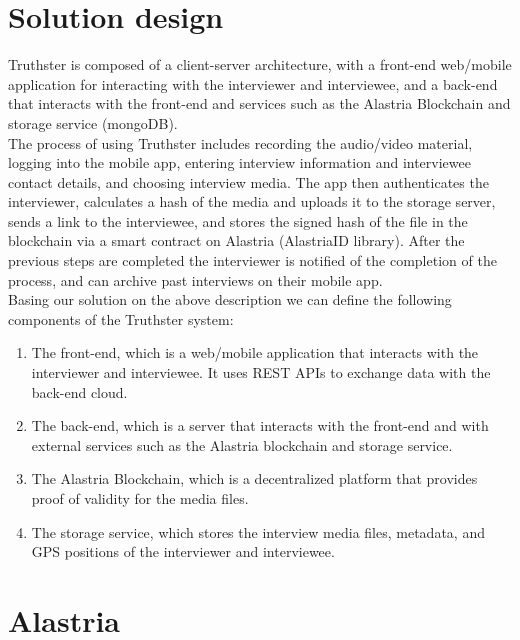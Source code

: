 \documentclass[target=mst,aauheader=]{thud}
\begin{document}
\chapter{Solution design}

Truthster is composed of a client-server architecture, with a front-end web/mobile application for interacting with the interviewer and interviewee, and a back-end that interacts with the front-end and services such as the Alastria Blockchain and storage service (mongoDB).\\
The process of using Truthster includes recording the audio/video material, logging into the mobile app, entering interview information and interviewee contact details, and choosing interview media. The app then authenticates the interviewer, calculates a hash of the media and uploads it to the storage server, sends a link to the interviewee, and stores the signed hash of the file in the blockchain via a smart contract on Alastria (AlastriaID library). After the previous steps are completed the interviewer is notified of the completion of the process, and can archive past interviews on their mobile app.\\
Basing our solution on the above description we can define the following components of the Truthster system:

\begin{enumerate}
    \item The front-end, which is a web/mobile application that interacts with the interviewer and interviewee. It uses REST APIs to exchange data with the back-end cloud.
    
    \item The back-end, which is a server that interacts with the front-end and with external services such as the Alastria blockchain and storage service.

    \item The Alastria Blockchain, which is a decentralized platform that provides proof of validity for the media files.

    \item The storage service, which stores the interview media files, metadata, and GPS positions of the interviewer and interviewee.
    
\end{enumerate}

\chapter{Alastria}
\end{document}
